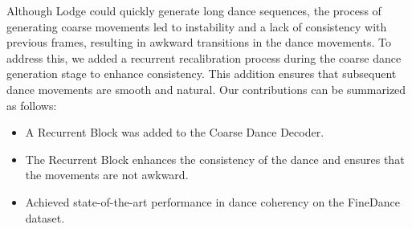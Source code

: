 
Although Lodge could quickly generate long dance sequences, the process of generating coarse movements led to instability and a lack of consistency with previous frames, resulting in awkward transitions in the dance movements. To address this, we added a recurrent recalibration process during the coarse dance generation stage to enhance consistency. This addition ensures that subsequent dance movements are smooth and natural. Our contributions can be summarized as follows:
\newline
\begin{itemize}
    \item A Recurrent Block was added to the Coarse Dance Decoder.
    \item The Recurrent Block enhances the consistency of the dance and ensures that the movements are not awkward.
    \item Achieved state-of-the-art performance in dance coherency on the FineDance \cite{li2023finedance} dataset.
\end{itemize}


